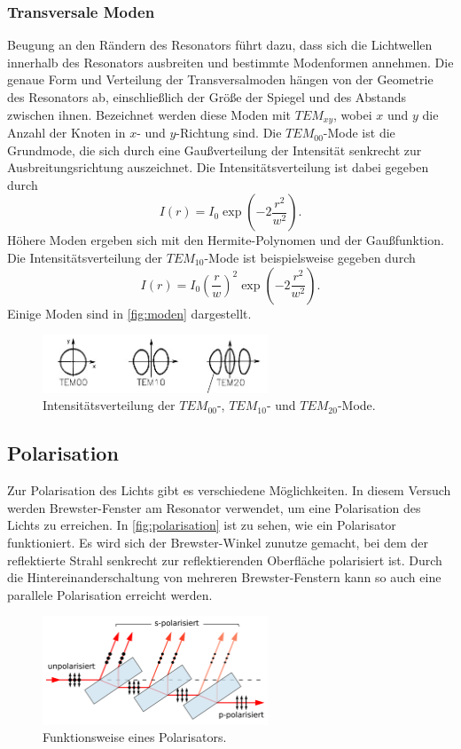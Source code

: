 \subsubsection{Transversale Moden}\label{sec:transversalemoden}
Beugung an den Rändern des Resonators führt dazu, dass sich die Lichtwellen innerhalb des Resonators ausbreiten und bestimmte Modenformen annehmen.
Die genaue Form und Verteilung der Transversalmoden hängen von der Geometrie des Resonators ab, einschließlich der Größe der Spiegel und des Abstands zwischen ihnen.
Bezeichnet werden diese Moden mit $TEM_{xy}$, wobei $x$ und $y$ die Anzahl der Knoten in $x$- und $y$-Richtung sind. Die $TEM_{00}$-Mode ist die Grundmode, die sich durch eine Gaußverteilung
der Intensität senkrecht zur Ausbreitungsrichtung auszeichnet. Die Intensitätsverteilung ist dabei gegeben durch
\begin{equation*}
    I(r) = I_0 \exp\left(-2\frac{r^2}{w^2}\right).
\end{equation*}
Höhere Moden ergeben sich mit den Hermite-Polynomen und der Gaußfunktion. Die Intensitätsverteilung der $TEM_{10}$-Mode ist beispielsweise gegeben durch
\begin{equation*}
    I(r) = I_0 \left(\frac{r}{w}\right)^2 \exp\left(-2\frac{r^2}{w^2}\right).
\end{equation*}
Einige Moden sind in \autoref{fig:moden} dargestellt.
\begin{figure}[H]
    \centering
    \includegraphics[width=0.6\textwidth]{grafiken/tem.jpg}
    \caption{Intensitätsverteilung der $TEM_{00}$-, $TEM_{10}$- und $TEM_{20}$-Mode.\cite{eichler}}
    \label{fig:moden}
\end{figure}
\subsection{Polarisation}\label{sec:polarisation}
Zur Polarisation des Lichts gibt es verschiedene Möglichkeiten. In diesem Versuch werden Brewster-Fenster am Resonator verwendet, um eine Polarisation des Lichts zu erreichen.
In \autoref{fig:polarisation} ist zu sehen, wie ein Polarisator funktioniert. Es wird sich der Brewster-Winkel zunutze gemacht, bei dem der reflektierte Strahl senkrecht zur reflektierenden
Oberfläche polarisiert ist. Durch die Hintereinanderschaltung von mehreren Brewster-Fenstern kann so auch eine parallele Polarisation erreicht werden.
\begin{figure}[H]
    \centering
    \includegraphics[width=0.6\textwidth]{grafiken/brewster.png}
    \caption{Funktionsweise eines Polarisators.\cite{brewster}}
    \label{fig:polarisation}
\end{figure}
